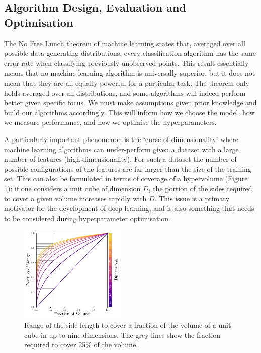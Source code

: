 \subsection{Algorithm Design, Evaluation and Optimisation}

The No Free Lunch theorem of machine learning \cite{NoFreeLunch} states that, averaged over all possible data-generating distributions, every classification algorithm has the same error rate when classifying previously unobserved points.
This result essentially means that no machine learning algorithm is universally superior, but it does not mean that they are all equally-powerful for a particular task. 
The theorem only holds averaged over all distributions, and some algorithms will indeed perform better given specific focus. We must make assumptions given prior knowledge and build our algorithms accordingly.
This will inform how we choose the model, how we measure performance, and how we optimise the hyperparameters. 


A particularly important phenomenon is the `curse of dimensionality' \cite{elementsOfStatsLearning} where machine learning algorithms can under-perform given a dataset with a large number of features (high-dimensionality).
For such a dataset the number of possible configurations of the features are far larger than the size of the training set. 
This can also be formulated in terms of coverage of a hypervolume (Figure \ref{fig:machine_learning:curse_of_dimensionality}): if one considers a unit cube of dimension $D$, the portion of the sides required to cover a given volume increases rapidly with $D$.
This issue is a primary motivator for the development of deep learning, and is also something that needs to be considered during hyperparameter optimisation. 
\begin{figure}[h!]
    \begin{center}
        \includegraphics[width=0.45\textwidth]{figures/machine_learning/curse_of_dimensionality.pdf}
    \end{center}
    \caption{Range of the side length to cover a fraction of the volume of a unit cube in up to nine dimensions. The grey lines show the fraction required to cover 25\% of the volume.}
        \label{fig:machine_learning:curse_of_dimensionality}
\end{figure}


